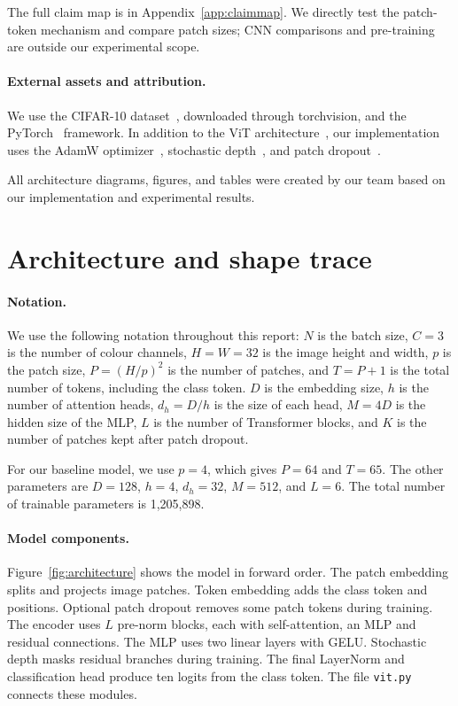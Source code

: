 \documentclass{article}
\begin{document}
The full claim map is in Appendix~\ref{app:claimmap}. We directly test the patch-token mechanism and compare patch sizes; CNN comparisons and pre-training are outside our experimental scope.



\paragraph{External assets and attribution.}

We use the CIFAR-10 dataset~\citep{krizhevsky2009learning}, 
downloaded through torchvision, and the 
PyTorch~\citep{paszke2019pytorch} framework. In addition to the 
ViT architecture~\citep{dosovitskiy2021image}, our implementation 
uses the AdamW optimizer~\citep{loshchilov2019decoupled}, 
stochastic depth~\citep{huang2016deep}, and patch 
dropout~\citep{liu2023patchdropout}.

All architecture diagrams, figures, and tables were created by 
our team based on our implementation and experimental results.

\section{Architecture and shape trace}
\label{sec:architecture}

\paragraph{Notation.}
We use the following notation throughout this report:
$N$ is the batch size, $C{=}3$ is the number of colour channels,
$H{=}W{=}32$ is the image height and width, $p$ is the patch size,
$P{=}(H/p)^2$ is the number of patches, and $T{=}P{+}1$ is the
total number of tokens, including the class token.
$D$ is the embedding size, $h$ is the number of attention heads,
$d_h{=}D/h$ is the size of each head, $M{=}4D$ is the hidden size
of the MLP, $L$ is the number of Transformer blocks, and $K$ is
the number of patches kept after patch dropout.

For our baseline model, we use $p{=}4$, which gives $P{=}64$
and $T{=}65$. The other parameters are $D{=}128$, $h{=}4$,
$d_h{=}32$, $M{=}512$, and $L{=}6$.
The total number of trainable parameters is 1{,}205{,}898.

\paragraph{Model components.}
Figure~\ref{fig:architecture} shows the model in forward order. The patch embedding splits and projects image patches. Token embedding adds the class token and positions. Optional patch dropout removes some patch tokens during training. The encoder uses $L$ pre-norm blocks, each with self-attention, an MLP and residual connections. The MLP uses two linear layers with GELU. Stochastic depth masks residual branches during training. The final LayerNorm and classification head produce ten logits from the class token. The file \texttt{vit.py} connects these modules.
\end{document}
